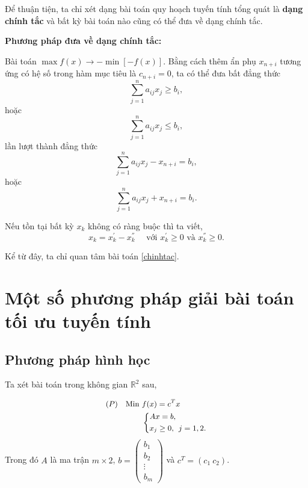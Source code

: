 \documentclass[12pt,a4paper]{report}
\begin{document}
Để thuận tiện, ta chỉ xét dạng bài toán quy hoạch tuyến tính tổng quát là \textbf{dạng chính tắc} và bất kỳ bài toán nào cũng có thể đưa về dạng chính tắc.


 \textbf{Phương pháp đưa về dạng chính tắc:}
    
     Bài toán $\max f(x) \longrightarrow -\min [-f(x)]$.
     Bằng cách thêm ẩn phụ $x_{n+i}$ tương ứng có hệ số trong hàm mục tiêu là $c_{n+i}=0$, ta có thể đưa bất đẳng thức 
    \begin{equation*}
    \sum _{j=1}^n a_{ij} x_j \geq b_i,
    \end{equation*}
    hoặc
    \begin{equation*}
    \sum _{j=1}^n a_{ij} x_j \leq b_i,
    \end{equation*}
    lần lượt thành đẳng thức
    \begin{equation*}
    \sum _{j=1}^n a_{ij} x_j - x_{n+i} = b_i,
    \end{equation*}
    hoặc
    \begin{equation*}
    \sum _{j=1}^n a_{ij} x_j + x_{n+i} = b_i.
    \end{equation*}
     
     Nếu tồn tại bất kỳ $x_k$ không có ràng buộc thì ta viết,
    \begin{equation*}
    x_k = x_k^{'} - x_k^{''} \quad \text{ với } x_k^{'} \geq 0 \text{ và } x_k^{''} \geq 0.
    \end{equation*}
    

Kể từ đây, ta chỉ quan tâm bài toán \eqref{chinhtac}.


\section{Một số phương pháp giải bài toán tối ưu tuyến tính}

\subsection{Phương pháp hình học}
Ta xét bài toán trong không gian $\mathbb{R}^2$ sau,

\begin{equation} \small \label{chinhtac}
	\begin{split}
	(P) \quad \text{Min } & f(x) = c^Tx \\
		& \left\{
		\begin{split}
		& Ax=b, \\
		& x_j \geq 0, \:\: j=1,2.
		\end{split}
		\right.    
	\end{split}
\end{equation}
Trong đó $A$ là ma trận $m\times 2$, $b=\begin{pmatrix}
	b_1 \\
	b_2 \\
	\vdots \\
	b_m
	\end{pmatrix}$ và $c^T=(c_1 \: c_2 )$.
\end{document}
